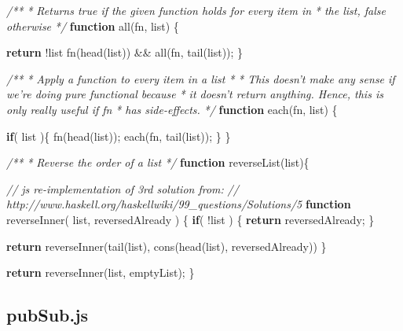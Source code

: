 \documentclass[]{article}
\newenvironment{Shaded}{}{}
\newcommand{\KeywordTok}[1]{\textcolor[rgb]{0.00,0.44,0.13}{\textbf{{#1}}}}
\newcommand{\CommentTok}[1]{\textcolor[rgb]{0.38,0.63,0.69}{\textit{{#1}}}}
\newcommand{\FunctionTok}[1]{\textcolor[rgb]{0.02,0.16,0.49}{{#1}}}
\newcommand{\NormalTok}[1]{{#1}}
\begin{document}
\begin{Shaded}
\begin{Highlighting}[]
\CommentTok{/** }
\CommentTok{ * Returns true if the given function holds for every item in }
\CommentTok{ * the list, false otherwise }
\CommentTok{ */}
\KeywordTok{function} \FunctionTok{all}\NormalTok{(fn, list) \{}
   
   \KeywordTok{return} \NormalTok{!list \textbar{}\textbar{} }
          \FunctionTok{fn}\NormalTok{(}\FunctionTok{head}\NormalTok{(list)) && }\FunctionTok{all}\NormalTok{(fn, }\FunctionTok{tail}\NormalTok{(list));}
\NormalTok{\}}

\CommentTok{/**}
\CommentTok{ * Apply a function to every item in a list}
\CommentTok{ * }
\CommentTok{ * This doesn't make any sense if we're doing pure functional because }
\CommentTok{ * it doesn't return anything. Hence, this is only really useful if fn }
\CommentTok{ * has side-effects. }
\CommentTok{ */}
\KeywordTok{function} \FunctionTok{each}\NormalTok{(fn, list) \{}

   \KeywordTok{if}\NormalTok{( list )\{  }
      \FunctionTok{fn}\NormalTok{(}\FunctionTok{head}\NormalTok{(list));}
      \FunctionTok{each}\NormalTok{(fn, }\FunctionTok{tail}\NormalTok{(list));}
   \NormalTok{\}}
\NormalTok{\}}

\CommentTok{/**}
\CommentTok{ * Reverse the order of a list}
\CommentTok{ */}
\KeywordTok{function} \FunctionTok{reverseList}\NormalTok{(list)\{ }

   \CommentTok{// js re-implementation of 3rd solution from:}
   \CommentTok{//    http://www.haskell.org/haskellwiki/99_questions/Solutions/5}
   \KeywordTok{function} \FunctionTok{reverseInner}\NormalTok{( list, reversedAlready ) \{}
      \KeywordTok{if}\NormalTok{( !list ) \{}
         \KeywordTok{return} \NormalTok{reversedAlready;}
      \NormalTok{\}}
      
      \KeywordTok{return} \FunctionTok{reverseInner}\NormalTok{(}\FunctionTok{tail}\NormalTok{(list), }\FunctionTok{cons}\NormalTok{(}\FunctionTok{head}\NormalTok{(list), reversedAlready))}
   \NormalTok{\}}

   \KeywordTok{return} \FunctionTok{reverseInner}\NormalTok{(list, emptyList);}
\NormalTok{\}}
\end{Highlighting}
\end{Shaded}

\pagebreak

\subsection{pubSub.js}
\end{document}
